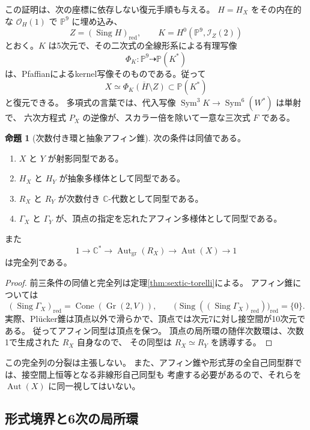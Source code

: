 \documentclass[a4paper,11pt]{ltjsarticle}
\theoremstyle{definition}
\newtheorem{theorem}{命題}[section]
\newcommand{\CC}{\mathbb C}
\newcommand{\OO}{\mathcal O}
\newcommand{\PP}{\mathbb P}
\newcommand{\Gr}{\operatorname{Gr}}
\begin{document}
この証明は、次の座標に依存しない復元手順も与える。
$H=H_X$ をその内在的な $\OO_H(1)$ で $\PP^9$ に埋め込み、
\[
 Z=(\operatorname{Sing}H)_{\mathrm{red}},\qquad
 K=H^0(\PP^9,\mathcal I_Z(2))
\]
とおく。$K$ は5次元で、その二次式の全線形系による有理写像
\[
 \Phi_K:\PP^9\dashrightarrow\PP(K^*)
\]
は、Pfaffianによるkernel写像そのものである。従って
\begin{equation}\label{eq:boundary-reconstruct-cubic}
                 X\simeq\overline{\Phi_K(H\setminus Z)}
                 \subset\PP(K^*)
\end{equation}
と復元できる。
多項式の言葉では、代入写像
$\operatorname{Sym}^3K\to\operatorname{Sym}^6(W^*)$ は単射で、
六次方程式 $P_X$ の逆像が、スカラー倍を除いて一意な三次式 $F$ である。

\begin{theorem}[次数付き環と抽象アフィン錐]\label{cor:affine-sextic-torelli}
次の条件は同値である。
\begin{enumerate}
\item $X$ と $Y$ が射影同型である。
\item $H_X$ と $H_Y$ が抽象多様体として同型である。
\item $R_X$ と $R_Y$ が次数付き $\CC$-代数として同型である。
\item $\Gamma_X$ と $\Gamma_Y$ が、頂点の指定を忘れたアフィン多様体として同型である。
\end{enumerate}
また
\[
 1\longrightarrow\CC^*\longrightarrow\operatorname{Aut}_{\mathrm{gr}}(R_X)
 \longrightarrow\operatorname{Aut}(X)\longrightarrow1
\]
は完全列である。
\end{theorem}

\begin{proof}
前三条件の同値と完全列は定理\ref{thm:sextic-torelli}による。
アフィン錐については
\[
 (\operatorname{Sing}\Gamma_X)_{\mathrm{red}}
   =\operatorname{Cone}(\Gr(2,V)),\qquad
 \bigl(\operatorname{Sing}((\operatorname{Sing}\Gamma_X)_{\mathrm{red}})\bigr)_{\mathrm{red}}
   =\{0\}.
\]
実際、Pl\"ucker錐は頂点以外で滑らかで、頂点では次元7に対し接空間が10次元である。
従ってアフィン同型は頂点を保つ。
頂点の局所環の随伴次数環は、次数1で生成された $R_X$ 自身なので、
その同型は $R_X\simeq R_Y$ を誘導する。
\end{proof}

この完全列の分裂は主張しない。
また、アフィン錐や形式芽の全自己同型群では、接空間上恒等となる非線形自己同型も
考慮する必要があるので、それらを $\operatorname{Aut}(X)$ に同一視してはいない。

\subsection{形式境界と6次の局所環}
\end{document}

